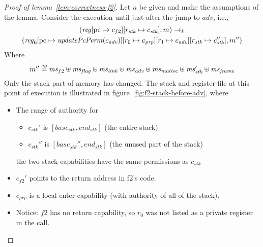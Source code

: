 \documentclass[a4paper]{article}
\newcommand{\update}[2]{[#1 \mapsto #2]}
\newcommand{\defeq}{\stackrel{\textit{\tiny{def}}}{=}}
\newcommand{\var}[1]{\mathit{#1}}
\newcommand{\hs}{\var{ms}}
\newcommand{\ms}{\hs}
\newcommand{\pcreg}{\mathrm{pc}}
\newcommand{\start}{\var{base}}
\newcommand{\addrend}{\var{end}}
\newcommand{\reg}{\var{reg}}
\newcommand{\adv}{\var{adv}}
\newcommand{\link}{\var{link}}
\newcommand{\stk}{\var{stk}}
\newcommand{\flag}{\var{flag}}
\newcommand{\plainfun}[2]{
  \ifthenelse{\equal{#2}{}}
  {\mathit{#1}}
  {\mathit{#1}(#2)}
}
\newcommand{\updatePcPerm}[1]{\plainfun{updatePcPerm}{#1}}
\newcommand{\codelabel}[1]{\mathit{#1}}
\newcommand{\malloc}{\codelabel{malloc}}
\newcommand{\step}[1][]{\rightarrow_{#1}}
\begin{document}
\begin{proof}[Proof of lemma~\ref{lem:correctness-f2}]
  Let $n$ be given and make the assumptions of the lemma. Consider the execution until just after the jump to $\adv$, i.e.,
  \begin{multline*}
    (\reg\update{\pcreg}{c_{f2}}\update{r_\stk}{c_\stk},m) \step[k] \\
    (\reg_0\update{\pcreg}{\updatePcPerm{c_\adv}}\update{r_0}{c_{\var{prp}}}\update{r_1}{c_\adv}\update{r_\stk}{c_\stk''},m'')
  \end{multline*}
  Where 
  \[
    m''  \defeq \hs_{f2} \uplus 
    \hs_\flag \uplus                
    \ms_\link \uplus 
    \hs_\adv \uplus 
    \ms_\malloc \uplus 
    \ms_\stk' \uplus
    \ms_{\var{frame}}
  \]
  Only the stack part of memory has changed. The stack and register-file at this point of execution is illustrated in figure~\ref{fig:f2-stack-before-adv}, where
  \begin{itemize}
  \item The range of authority for 
    \begin{itemize}
    \item $c_\stk'$ is $[\start_\stk,\addrend_\stk]$ (the entire stack)
    \item $c_\stk''$ is $[\start_\stk'',\addrend_\stk]$ (the unused part of the stack)
    \end{itemize}
    the two stack capabilities have the same permissions as $c_\stk$
  \item $c_{f2}'$ points to the return address in f2's code.
  \item $c_{\var{prp}}$ is a local enter-capability (with authority of all of the stack).
  \item Notice: $f2$ has no return capability, so $r_0$ was not listed as a private register in the call.
  \end{itemize}


\end{proof}
\end{document}
